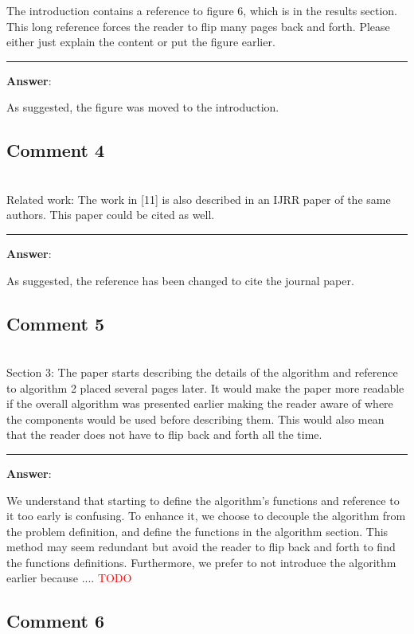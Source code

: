 \documentclass{scrartcl}
\newcommand{\todo}{\textcolor{red}{TODO}}
\begin{document}
The introduction contains a reference to figure 6, which is in the results section. This long reference forces the reader to flip many pages back and forth. Please either just explain the content or put the figure earlier.

\rule{\linewidth}{.1pt}
\textbf{Answer}:

As suggested, the figure was moved to the introduction.

\subsection{Comment 4}
\hrulefill\\

Related work: 
The work in [11] is also described in an IJRR paper of the same authors. This paper could be cited as well.

\rule{\linewidth}{.1pt}
\textbf{Answer}:

As suggested, the reference has been changed to cite the journal paper.

\subsection{Comment 5}
\hrulefill\\

Section 3:
The paper starts describing the details of the algorithm and reference to algorithm 2 placed several pages later. It would make the paper more readable if the overall algorithm was presented earlier making the reader aware of where the components would be used before describing them. This would also mean that the reader does not have to flip back and forth all the time.

\rule{\linewidth}{.1pt}
\textbf{Answer}:

We understand that starting to define the algorithm's functions and reference to it too early is confusing. To enhance it, we choose to decouple the algorithm from the problem definition, and define the functions in the algorithm section. This method may seem redundant but avoid the reader to flip back and forth to find the functions definitions.
Furthermore, we prefer to not introduce the algorithm earlier because .... \todo

\subsection{Comment 6}
\hrulefill\\
\end{document}
